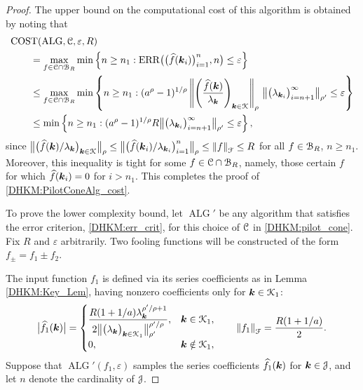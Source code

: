 \documentclass[USenglish]{article}
\theoremstyle{dgthm}
\theoremstyle{dgthm}
\theoremstyle{dgthm}
\theoremstyle{dgthm}
\theoremstyle{dgdef}
\theoremstyle{definition}
\DeclareMathOperator{\ALG}{ALG}
\DeclareMathOperator{\ERR}{ERR}
\newcommand{\dataN}{\bigl(\hf(\bsk_i)\bigr)_{i=1}^n}
\newcommand{\ERRN}{\ERR\bigl(\dataN,n\bigr)}
\DeclareMathOperator{\COST}{COST}
\newcommand{\hf}{\widehat{f}}
\newcommand{\bigabs}[1]{\ensuremath{\bigl \lvert #1 \bigr \rvert}}
\newcommand{\norm}[2][{}]{\ensuremath{\left \lVert #2 \right \rVert}_{#1}}
\newcommand{\bignorm}[2][{}]{\ensuremath{\bigl \lVert #2 \bigr \rVert}_{#1}}
\begin{document}
\begin{proof} 
The upper bound on the computational cost of this algorithm is obtained by noting that 
\begin{align*}
    \MoveEqLeft{\COST(\ALG,\calC,\varepsilon,R)} \\
    & = \max_{f \in \calC \cap \calB_{R}} \min \left \{n \ge n_1 : \ERRN \le \varepsilon \right \} \\
     & \le \max_{f \in \calC \cap \calB_{R}} \min \left \{n \ge n_1 : 
     (a^\rho -1)^{1/\rho} \norm[\rho]{\left( \frac{\hf(\bsk)}{\lambda_{\bsk}} \right)_{\bsk \in \calK}} \, 
     \bignorm[\rho']{\bigl(  \lambda_{\bsk_i}  \bigr)_{i = n+1}^{\infty}}
    \le \varepsilon \right \} \\   
     & \le \min \left \{n \ge n_1 : 
     (a^\rho -1)^{1/\rho} R \bignorm[\rho']{\bigl(  \lambda_{\bsk_i}  \bigr)_{i = n+1}^{\infty}} 
    \le \varepsilon \right \},  
\end{align*}
since $\bignorm[\rho]{\bigl( \hf(\bsk)/\lambda_{\bsk} \bigr)_{\bsk \in \calK}} \le \bignorm[\rho]{\bigl( \hf(\bsk_i)/\lambda_{\bsk_i} \bigr)_{i=1}^{n}} \le  \norm[\calF]{f} \le R$ for all $f \in {\mathcal{B}}_R$, $n \ge n_1$.  Moreover, this inequality is tight for some $f \in {\mathcal{C}} \cap {\mathcal{B}}_{R}$, namely, those certain $f$ for which $\hf(\bsk_i) = 0$ for $i > n_1$.  This completes the proof of \eqref{DHKM:PilotConeAlg_cost}.

To prove the lower complexity bound, let $\ALG'$ be any algorithm that satisfies the error criterion, \eqref{DHKM:err_crit}, for this choice of ${\mathcal{C}}$ in \eqref{DHKM:pilot_cone}.   Fix $R$ and $\varepsilon$ arbitrarily.  Two fooling functions will be constructed of the form $f_\pm = f_1 \pm f_2$.  

The input function $f_1$ is defined via its series coefficients as in Lemma \ref{DHKM:Key_Lem}, having nonzero coefficients only for ${\boldsymbol{k}} \in {\mathcal{K}}_1$:
\begin{equation*}
    \bigabs{\hf_1(\bsk)} = \begin{cases} \displaystyle \frac{R (1+1/a) \lambda_{\bsk}^{\rho'/\rho + 1}}{2\bignorm[\rho']{\bigl(  \lambda_{\bsk}  \bigr)_{\bsk \in \calK_1}}^{\rho'/\rho}}, &  \bsk \in \calK_1, \\
    0, & \bsk \notin \calK_1,
    \end{cases}
   \qquad \norm[\calF]{f_1} = \frac{R(1 + 1/a)}{2}.
\end{equation*}
Suppose that $\ALG'(f_1,\varepsilon)$ samples the series coefficients $\hf_1(\bsk)$ for ${\boldsymbol{k}} \in {\mathcal{J}}$, and let $n$ denote the cardinality of ${\mathcal{J}}$.  


\end{proof}
\end{document}
